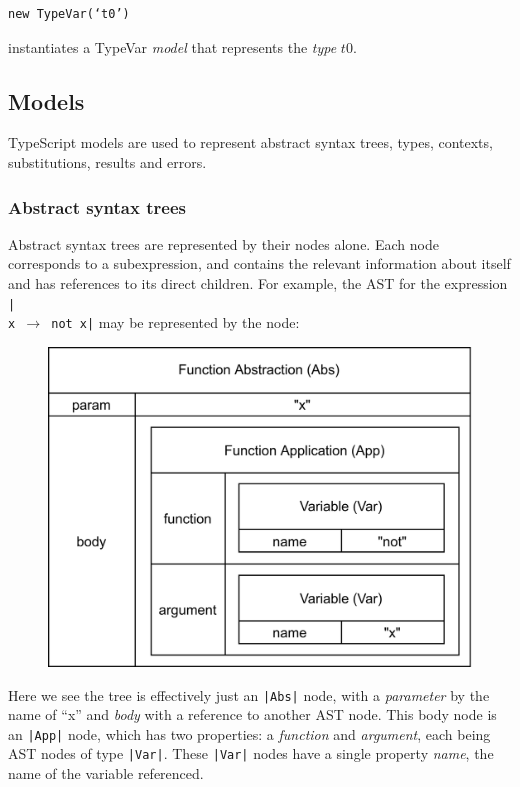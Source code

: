\documentclass[a4paper,fleqn,oneside,12pt]{report}
\begin{document}
\begin{verbatim}
new TypeVar(‘t0’)
\end{verbatim}

instantiates a TypeVar \textit{model} that represents the \textit{type} $t0$.
\subsection{Models}\label{id:h.f0aymht9bwx3}
TypeScript models are used to represent abstract syntax trees, types, contexts, substitutions, results and errors.
\subsubsection{Abstract syntax trees}\label{id:h.26q0jf334v10}
Abstract syntax trees are represented by their nodes alone. Each node corresponds to a subexpression, and contains the relevant information about itself and has references to its direct children. For example, the AST for the expression \texttt{|\\x $\rightarrow$ not x|} may be represented by the node:

{\centering \begin{figure}[h!]
  \centering
  \includegraphics[width=0.863\linewidth]{images/image19.png}
\end{figure} \par}

Here we see the tree is effectively just an \texttt{|Abs|} node, with a \textit{parameter} by the name of “x” and \textit{body} with a reference to another AST node. This body node is an \texttt{|App|} node, which has two properties: a \textit{function} and \textit{argument}, each being AST nodes of type \texttt{|Var|}. These \texttt{|Var|} nodes have a single property \textit{name}, the name of the variable referenced.
\end{document}
